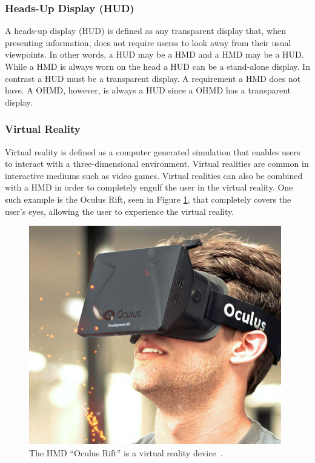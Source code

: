 \subsubsection{Heads-Up Display (HUD)}
\label{subsubsec:hud}
A heads-up display (HUD)\cite{hudWiki} is defined as any transparent display that, when presenting information, does not require userss to look away from their usual viewpoints. In other words, a HUD may be a HMD and a HMD may be a HUD. While a HMD is always worn on the head a HUD can be a stand-alone display. In contrast a HUD must be a transparent display. A requirement a HMD does not have. A OHMD, however, is always a HUD since a OHMD has a transparent display.

\subsubsection{Virtual Reality}
\label{subsubsec:vr}
Virtual reality\cite{virtualRealityDef} is defined as a computer generated simulation that enables users to interact with a three-dimensional environment. Virtual realities are common in interactive mediums such as video games. Virtual realities can also be combined with a HMD in order to completely engulf the user in the virtual reality. One such example is the Oculus Rift, seen in Figure \ref{OculusRift}, that completely covers the user's eyes, allowing the user to experience the virtual reality.

	\begin{figure}[ht!]
		\centering
		\includegraphics[width=110mm]{images/OculusRift}
		\caption{The HMD ``Oculus Rift'' is a virtual reality device~\cite{ImagesOculusRift}.}
		\label{OculusRift}
	\end{figure}

